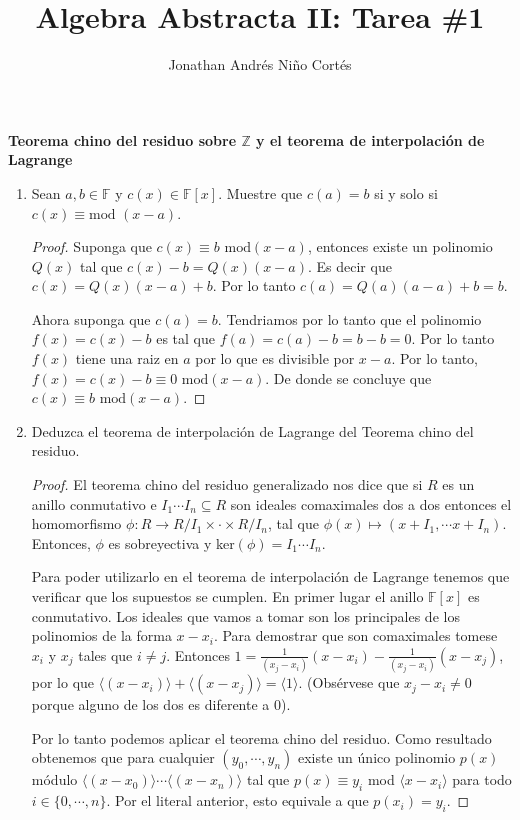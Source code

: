 \documentclass[letter,twoside,12pt]{article}
\title{Algebra Abstracta II: Tarea \#1}
\author{Jonathan Andr\'es Ni\~no Cort\'es}
\begin{document}
\maketitle
\textbf{Teorema chino del residuo sobre $\mathbb{Z}$ y el teorema de interpolaci\'on de Lagrange}
\begin{enumerate}[label=\textbf{(\alph*)}]
\item Sean $a,b \in \mathbb{F}$ y $ c(x) \in \mathbb{F}[x]$. Muestre que $ c(a)=b $ si y solo si $ c(x) \equiv \text{mod } (x-a) $.

\begin{proof}
Suponga que $c(x) \equiv b \text{ mod} (x-a)$, entonces existe un polinomio $ Q(x) $ tal que $c(x)-b=Q(x)(x-a)$. Es decir que $c(x)=Q(x)(x-a)+b$. Por lo tanto $c(a)=Q(a)(a-a)+b=b$.

Ahora suponga que $c(a)=b$. Tendriamos por lo tanto que el polinomio $f(x)=c(x)-b$ es tal que $ f(a)=c(a)-b=b-b = 0$. Por lo tanto $f(x)$ tiene una raiz en $a$ por lo que es divisible por $ x-a $. Por lo tanto, $f(x)=c(x)-b \equiv 0 \text{ mod} (x-a)$. De donde se concluye que $c(x) \equiv b \text{ mod} (x-a)$.
\end{proof}

\item Deduzca el teorema de interpolaci\'on de Lagrange del Teorema chino del residuo.
\begin{proof}
El teorema chino del residuo generalizado nos dice que si $R$ es un anillo conmutativo e $I_1 \cdots I_n \subseteq R$ son ideales comaximales dos a dos entonces el homomorfismo $\phi:R \to R/I_1 \times \cdot \times R/I_n$, tal que $\phi(x) \mapsto (x+I_1, \cdots x+I_n)$. Entonces, $\phi$ es sobreyectiva y ker$ (\phi)=I_1\cdots I_n$. 

Para poder utilizarlo en el teorema de interpolaci\'on de Lagrange tenemos que verificar que los supuestos se cumplen. En primer lugar el anillo $\mathbb{F}[x]$ es conmutativo. Los ideales que vamos a tomar son los principales de los polinomios de la forma $ x-x_i $. Para demostrar que son comaximales tomese $x_i$ y $x_j$ tales que $i \not = j$. Entonces $ 1= \frac{1}{(x_j-x_i)}(x-x_i)-\frac{1}{(x_j-x_i)}(x-x_j) $, por lo que $\langle(x-x_i) \rangle + \langle(x-x_j) \rangle = \langle 1 \rangle$. (Obs\'ervese que $x_j-x_i \not = 0$ porque alguno de los dos es diferente a $0$).

Por lo tanto podemos aplicar el teorema chino del residuo. Como resultado obtenemos que para cualquier $(y_0, \cdots, y_n)$ existe un \'unico polinomio $p(x)$ m\'odulo $ \langle(x-x_0) \rangle\cdots \langle(x-x_n) \rangle $ tal que $p(x) \equiv y_i$ mod $ \langle x-x_i \rangle$ para todo $i \in \{0,\cdots, n\}$. Por el literal anterior, esto equivale a que $p(x_i)=y_i$.


\end{proof}
\end{enumerate}
\end{document}
